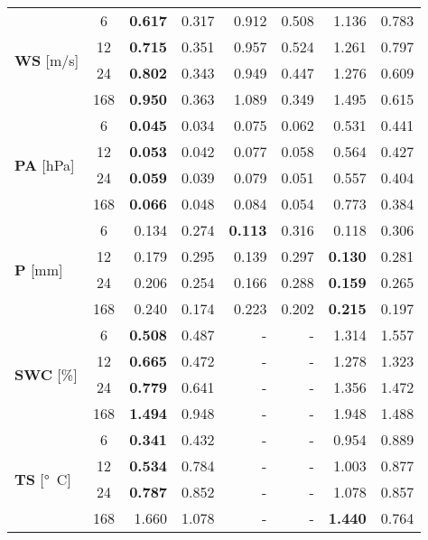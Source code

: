 \begin{table}
\begin{tabular}{p{2.1cm}c|rr|rr|rr}
\cline{1-8}
\multirow[c]{4}{*}{\parbox{2.1cm}{\textbf{WS} [\si{m/s}]}} & 6 & \bfseries 0.617 & 0.317 & 0.912 & 0.508 & 1.136 & 0.783 \\
 & 12 & \bfseries 0.715 & 0.351 & 0.957 & 0.524 & 1.261 & 0.797 \\
 & 24 & \bfseries 0.802 & 0.343 & 0.949 & 0.447 & 1.276 & 0.609 \\
 & 168 & \bfseries 0.950 & 0.363 & 1.089 & 0.349 & 1.495 & 0.615 \\
\cline{1-8}
\multirow[c]{4}{*}{\parbox{2.1cm}{\textbf{PA} [\si{hPa}]}} & 6 & \bfseries 0.045 & 0.034 & 0.075 & 0.062 & 0.531 & 0.441 \\
 & 12 & \bfseries 0.053 & 0.042 & 0.077 & 0.058 & 0.564 & 0.427 \\
 & 24 & \bfseries 0.059 & 0.039 & 0.079 & 0.051 & 0.557 & 0.404 \\
 & 168 & \bfseries 0.066 & 0.048 & 0.084 & 0.054 & 0.773 & 0.384 \\
\cline{1-8}
\multirow[c]{4}{*}{\parbox{2.1cm}{\textbf{P} [\si{mm}]}} & 6 & 0.134 & 0.274 & \bfseries 0.113 & 0.316 & 0.118 & 0.306 \\
 & 12 & 0.179 & 0.295 & 0.139 & 0.297 & \bfseries 0.130 & 0.281 \\
 & 24 & 0.206 & 0.254 & 0.166 & 0.288 & \bfseries 0.159 & 0.265 \\
 & 168 & 0.240 & 0.174 & 0.223 & 0.202 & \bfseries 0.215 & 0.197 \\
\cline{1-8}
\multirow[c]{4}{*}{\parbox{2.1cm}{\textbf{SWC} [\si{\%}]}} & 6 & \bfseries 0.508 & 0.487 & - & - & 1.314 & 1.557 \\
 & 12 & \bfseries 0.665 & 0.472 & - & - & 1.278 & 1.323 \\
 & 24 & \bfseries 0.779 & 0.641 & - & - & 1.356 & 1.472 \\
 & 168 & \bfseries 1.494 & 0.948 & - & - & 1.948 & 1.488 \\
\cline{1-8}
\multirow[c]{4}{*}{\parbox{2.1cm}{\textbf{TS} [\si{°C}]}} & 6 & \bfseries 0.341 & 0.432 & - & - & 0.954 & 0.889 \\
 & 12 & \bfseries 0.534 & 0.784 & - & - & 1.003 & 0.877 \\
 & 24 & \bfseries 0.787 & 0.852 & - & - & 1.078 & 0.857 \\
 & 168 & 1.660 & 1.078 & - & - & \bfseries 1.440 & 0.764 \\
\cline{1-8}
\bottomrule
\end{tabular}
\end{table}
